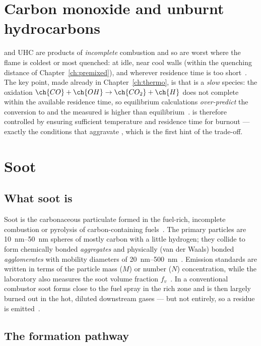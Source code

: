 \section{Carbon monoxide and unburnt hydrocarbons}

 and UHC are products of \emph{incomplete} combustion and so are worst where the flame is coldest or most quenched: at idle, near cool walls (within the quenching distance of Chapter~\ref{ch:premixed}), and wherever residence time is too short~\cite{lecture12,lecture13}. The key point, made already in Chapter~\ref{ch:thermo}, is that  is a \emph{slow} species: the oxidation $\ch{CO}+\ch{OH}\rightarrow\ch{CO_2}+\ch{H}$ does not complete within the available residence time, so equilibrium calculations \emph{over-predict} the conversion to  and the measured  is higher than equilibrium~\cite{transcript_tutorial,warnatz2006combustion}.  is therefore controlled by ensuring sufficient temperature and residence time for burnout --- exactly the conditions that aggravate , which is the first hint of the trade-off.

\section{Soot}

\subsection{What soot is}

Soot is the carbonaceous particulate formed in the fuel-rich, incomplete combustion or pyrolysis of carbon-containing fuels~\cite{lecture12}. The primary particles are \SIrange{10}{50}{nm} spheres of mostly carbon with a little hydrogen; they collide to form chemically bonded \emph{aggregates} and physically (van der Waals) bonded \emph{agglomerates} with mobility diameters of \SIrange{20}{500}{nm}~\cite{lecture12,haynes1981soot}. Emission standards are written in terms of the particle mass ($M$) or number ($N$) concentration, while the laboratory also measures the soot volume fraction $f_v$~\cite{lecture12}. In a conventional combustor soot forms close to the fuel spray in the rich zone and is then largely burned out in the hot, diluted downstream gases --- but not entirely, so a residue is emitted~\cite{lecture12}.

\subsection{The formation pathway}

